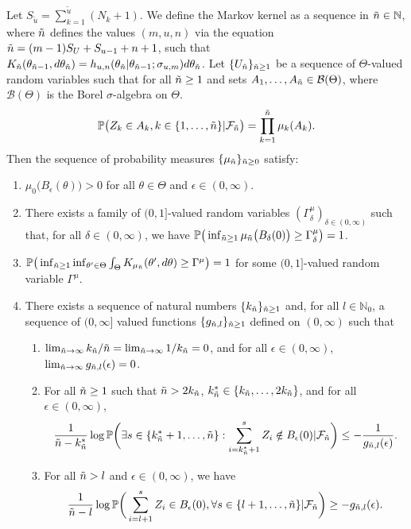 Let $S_{\tilde{u}} = \sum_{k = 1}^{\tilde{u}} (N_{k} + 1)$. 
We define the Markov kernel as a sequence in $\tilde{n} \in \mathbb{N}$, where $\tilde{n}$ defines the values $(m, u, n)$ via the equation $\tilde{n} = (m-1)S_U + S_{u-1}+n+1$, such that $K_{\tilde{n}}(\theta_{\tilde{n}-1}, d\theta_{\tilde{n}}) = h_{u, n}(\theta_{\tilde{n}}|\theta_{\tilde{n}-1};\sigma_{u, m})d\theta_{\tilde{n}}$.
Let $\{U_{\tilde{n}}\}_{\tilde{n} \geq 1}$ be a sequence of $\Theta$-valued random variables such that for all $\tilde{n} \geq 1$ and sets $A_1, \ldots, A_{\tilde{n}} \in \mathcal{B}(\Theta)$, where $\mathcal{B}(\Theta)$ is the Borel $\sigma$-algebra on $\Theta$. 
    $$
    \mathbb{P}\big(Z_k \in A_k, k\in \{1, \ldots, \tilde{n}\} | \mathcal{F}_{\tilde{n}}\big) = \prod_{k = 1}^{\tilde{n}} \mu_k(A_k). 
    $$
Then the sequence of probability measures $\{\mu_{\tilde{n}}\}_{\tilde{n} \geq 0}$ satisfy:
    \begin{enumerate}[label=(C\arabic*), ref=(C\arabic*)]
      \item $\mu_0\big(B_{\epsilon}(\theta)\big) > 0$ for all $\theta \in \Theta$ and $\epsilon \in (0, \infty)$.\label{assumption:kernel1}
      \item There exists a family of $(0, 1]$-valued random variables $(\Gamma^\mu_\delta)_{\delta \in (0, \infty)}$ such that, for all $\delta \in (0, \infty)$, we have $\mathbb{P}\big(\inf_{\tilde{n} \geq 1}\mu_{\tilde{n}}\big(B_\delta(0)\big) \geq \Gamma_{\delta}^\mu\big) = 1$.\label{assumption:kernel2}
      \item $\mathbb{P}\big(\inf_{\tilde{n} \geq 1}\inf_{\theta' \in \Theta}\int_\Theta K_{\mu_{\tilde{n}}}(\theta', d\theta) \geq \Gamma^\mu\big) = 1$ for some $(0, 1]$-valued random variable $\Gamma^\mu$.\label{assumption:kernel3}
      \item \label{assumption:kernel4} There exists a sequence of natural numbers $\{k_{\tilde{n}}\}_{\tilde{n} \geq 1}$ and, for all $l \in \mathbb{N}_0$, a sequence of $(0, \infty]$ valued functions $\{g_{\tilde{n}, l}\}_{\tilde{n} \geq 1}$ defined on $(0, \infty)$ such that \begin{enumerate} 
  \item $\lim_{\tilde{n} \rightarrow \infty} k_{\tilde{n}} / {\tilde{n}} = \lim_{\tilde{n} \rightarrow \infty} 1/k_{\tilde{n}} = 0$, and for all $\epsilon \in (0, \infty)$, $\lim_{\tilde{n} \rightarrow \infty}g_{\tilde{n}, l}(\epsilon) = 0$. 
  \item For all $\tilde{n} \geq 1$ such that $\tilde{n} > 2k_{\tilde{n}}$, $k^*_{\tilde{n}} \in \{k_{\tilde{n}}, \ldots, 2k_{\tilde{n}}\}$, and for all $\epsilon \in (0, \infty)$,
  $$
  \frac{1}{\tilde{n} - k^*_{\tilde{n}}}\log \mathbb{P} \bigg(\exists s \in \{k^*_{\tilde{n}} + 1, \ldots, \tilde{n}\}: \sum_{i = k^*_{\tilde{n}} + 1}^s Z_i \notin B_{\epsilon}(0) | \mathcal{F}_{\tilde{n}}\bigg) \leq -\frac{1}{g_{\tilde{n}, l}(\epsilon)}.
  $$
  \item For all $\tilde{n} > l$ and $\epsilon \in (0, \infty)$, we have 
  $$
  \frac{1}{\tilde{n}-l}\log \mathbb{P} \bigg(\sum_{i = l + 1}^{s} Z_i \in B_{\epsilon}(0), \forall s \in \{l + 1, \ldots, \tilde{n}\}|\mathcal{F}_{\tilde{n}}\bigg) \geq -g_{\tilde{n}, l}(\epsilon).
  $$
  \end{enumerate}    
\end{enumerate}